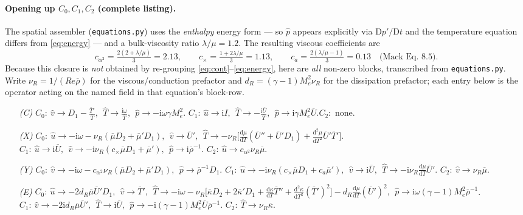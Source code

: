 \documentclass[11pt]{article}
\newcommand{\D}{\mathrm{D}}
\newcommand{\imag}{\mathrm{i}}
\newcommand{\Mae}{M_e}
\newcommand{\Ree}{\mathit{Re}}
\renewcommand{\bar}[1]{\overline{#1}}
\newcommand{\hatu}{\hat{u}}
\newcommand{\hatv}{\hat{v}}
\newcommand{\hatT}{\hat{T}}
\newcommand{\hatp}{\hat{p}}
\newcommand{\nuR}{\nu_{\!R}}
\begin{document}
\paragraph{Opening up $C_0,C_1,C_2$ (complete listing).} The spatial assembler (\texttt{equations.py}) uses
the \emph{enthalpy} energy form --- so $\hatp$ appears explicitly via $\D p'/\D t$ and the temperature
equation differs from \eqref{eq:energy} --- and a bulk-viscosity ratio $\lambda/\mu=1.2$. The resulting
viscous coefficients are
\begin{equation}
  c_{\alpha^2}=\tfrac{2(2+\lambda/\mu)}{3}=2.13,\qquad
  c_\times=\tfrac{1+2\lambda/\mu}{3}=1.13,\qquad
  c_a=\tfrac{2(\lambda/\mu-1)}{3}=0.13 \quad\text{(Mack Eq.~8.5)} .
\end{equation}
Because this closure is \emph{not} obtained by re-grouping \eqref{eq:cont}--\eqref{eq:energy}, here are
\emph{all} non-zero blocks, transcribed from \texttt{equations.py}. Write $\nuR=1/(\Ree\bar\rho)$ for the
viscous/conduction prefactor and $d_R=(\gamma-1)\Mae^2\nuR$ for the dissipation prefactor; each entry below
is the operator acting on the named field in that equation's block-row.
{\footnotesize
\begin{itemize}[leftmargin=2.6em,itemsep=2pt]
\item[\emph{(C)}] $C_0\!:\ \hatv\!\to D_1-\tfrac{\bar T'}{\bar T},\ \ \hatT\!\to\tfrac{\imag\omega}{\bar T},\ \ \hatp\!\to-\imag\omega\gamma\Mae^2$.\quad
  $C_1\!:\ \hatu\!\to\imag I,\ \ \hatT\!\to-\tfrac{\imag\bar U}{\bar T},\ \ \hatp\!\to\imag\gamma\Mae^2\bar U$.\quad $C_2\!:$ none.
\item[\emph{(X)}] $C_0\!:\ \hatu\!\to-\imag\omega-\nuR(\bar\mu D_2+\bar\mu'D_1),\ \ \hatv\!\to\bar U',\ \
  \hatT\!\to-\nuR\big[\tfrac{\mathrm d\mu}{\mathrm dT}(\bar U''+\bar U'D_1)+\tfrac{\mathrm d^2\mu}{\mathrm dT^2}\bar U'\bar T'\big]$.\quad
  $C_1\!:\ \hatu\!\to\imag\bar U,\ \ \hatv\!\to-\imag\nuR(c_\times\bar\mu D_1+\bar\mu'),\ \ \hatp\!\to\imag\bar\rho^{-1}$.\quad
  $C_2\!:\ \hatu\!\to c_{\alpha^2}\nuR\bar\mu$.
\item[\emph{(Y)}] $C_0\!:\ \hatv\!\to-\imag\omega-c_{\alpha^2}\nuR(\bar\mu D_2+\bar\mu'D_1),\ \ \hatp\!\to\bar\rho^{-1}D_1$.\quad
  $C_1\!:\ \hatu\!\to-\imag\nuR(c_\times\bar\mu D_1+c_a\bar\mu'),\ \ \hatv\!\to\imag\bar U,\ \ \hatT\!\to-\imag\nuR\tfrac{\mathrm d\mu}{\mathrm dT}\bar U'$.\quad
  $C_2\!:\ \hatv\!\to\nuR\bar\mu$.
\item[\emph{(E)}] $C_0\!:\ \hatu\!\to-2d_R\bar\mu\bar U'D_1,\ \ \hatv\!\to\bar T',\ \
  \hatT\!\to-\imag\omega-\nuR\big[\bar\kappa D_2+2\bar\kappa'D_1+\tfrac{\mathrm d\kappa}{\mathrm dT}\bar T''+\tfrac{\mathrm d^2\kappa}{\mathrm dT^2}(\bar T')^2\big]-d_R\tfrac{\mathrm d\mu}{\mathrm dT}(\bar U')^2,\ \ \hatp\!\to\imag\omega(\gamma-1)\Mae^2\bar\rho^{-1}$.\quad
  $C_1\!:\ \hatv\!\to-2\imag d_R\bar\mu\bar U',\ \ \hatT\!\to\imag\bar U,\ \ \hatp\!\to-\imag(\gamma-1)\Mae^2\bar U\bar\rho^{-1}$.\quad
  $C_2\!:\ \hatT\!\to\nuR\bar\kappa$.
\end{itemize}}
\end{document}
